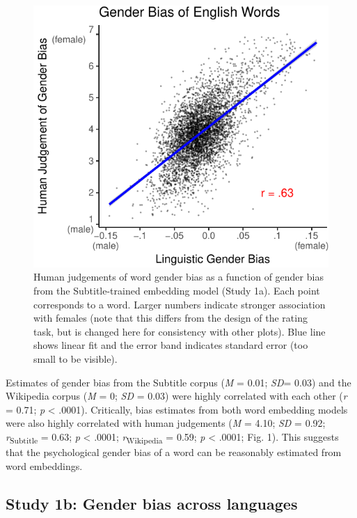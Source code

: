 \documentclass[man,floatsintext]{apa6}
\begin{document}
\begin{figure}
\centering
\includegraphics{iat_lang_pnas_files/figure-latex/unnamed-chunk-10-1.pdf}
\caption{\label{fig:unnamed-chunk-10}Human judgements of word gender bias as a function of gender bias from the Subtitle-trained embedding model (Study 1a). Each point corresponds to a word. Larger numbers indicate stronger association with females (note that this differs from the design of the rating task, but is changed here for consistency with other plots). Blue line shows linear fit and the error band indicates standard error (too small to be visible).}
\end{figure}

Estimates of gender bias from the Subtitle corpus (\emph{M} = 0.01; \emph{SD}= 0.03) and the Wikipedia corpus (\emph{M} = 0; \emph{SD} = 0.03) were highly correlated with each other (\emph{r} = 0.71; \emph{p} \textless{} .0001). Critically, bias estimates from both word embedding models were also highly correlated with human judgements (\emph{M} = 4.10; \emph{SD} = 0.92; \emph{r}\textsubscript{Subtitle} = 0.63; \emph{p} \textless{} .0001; \emph{r}\textsubscript{Wikipedia} = 0.59; \emph{p} \textless{} .0001; Fig. 1). This suggests that the psychological gender bias of a word can be reasonably estimated from word embeddings.

\hypertarget{study-1b-gender-bias-across-languages}{%
\subsection{Study 1b: Gender bias across languages}\label{study-1b-gender-bias-across-languages}}
\end{document}
